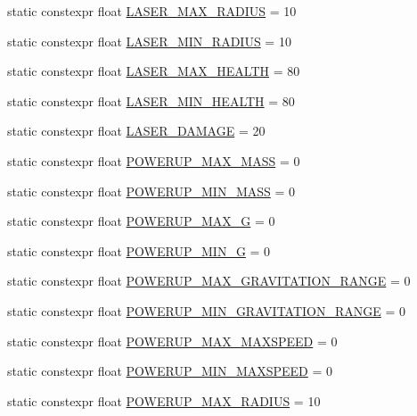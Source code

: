 \begin{DoxyCompactItemize}
\item 
static constexpr float \hyperlink{class_act_conf_a1390b199da20ff11340cf353c75214d9}{L\+A\+S\+E\+R\+\_\+\+M\+A\+X\+\_\+\+R\+A\+D\+I\+U\+S} = 10
\item 
static constexpr float \hyperlink{class_act_conf_a82640220f6656034ee26ad49a2b73b9a}{L\+A\+S\+E\+R\+\_\+\+M\+I\+N\+\_\+\+R\+A\+D\+I\+U\+S} = 10
\item 
static constexpr float \hyperlink{class_act_conf_a536a950abcd330987f54791a57ccccb1}{L\+A\+S\+E\+R\+\_\+\+M\+A\+X\+\_\+\+H\+E\+A\+L\+T\+H} = 80
\item 
static constexpr float \hyperlink{class_act_conf_ae02d18076a07bf6059bf6df5dffe4fd1}{L\+A\+S\+E\+R\+\_\+\+M\+I\+N\+\_\+\+H\+E\+A\+L\+T\+H} = 80
\item 
static constexpr float \hyperlink{class_act_conf_a1f29a01198277a3c0cfeb8226b9c0ab2}{L\+A\+S\+E\+R\+\_\+\+D\+A\+M\+A\+G\+E} = 20
\item 
static constexpr float \hyperlink{class_act_conf_ae478e5bb4115c0a92915029f3a601ec8}{P\+O\+W\+E\+R\+U\+P\+\_\+\+M\+A\+X\+\_\+\+M\+A\+S\+S} = 0
\item 
static constexpr float \hyperlink{class_act_conf_a158916d4ae5c59ead3bc818deccc270c}{P\+O\+W\+E\+R\+U\+P\+\_\+\+M\+I\+N\+\_\+\+M\+A\+S\+S} = 0
\item 
static constexpr float \hyperlink{class_act_conf_a8fbd08c18f70df5af43e85ef4920cdba}{P\+O\+W\+E\+R\+U\+P\+\_\+\+M\+A\+X\+\_\+\+G} = 0
\item 
static constexpr float \hyperlink{class_act_conf_a3977a3808f719611b96014842d20435e}{P\+O\+W\+E\+R\+U\+P\+\_\+\+M\+I\+N\+\_\+\+G} = 0
\item 
static constexpr float \hyperlink{class_act_conf_ada24ed05884db1e2cdc365aa0d095cf3}{P\+O\+W\+E\+R\+U\+P\+\_\+\+M\+A\+X\+\_\+\+G\+R\+A\+V\+I\+T\+A\+T\+I\+O\+N\+\_\+\+R\+A\+N\+G\+E} = 0
\item 
static constexpr float \hyperlink{class_act_conf_afd6eeae83a436cd4d2f481c6fe58e8f4}{P\+O\+W\+E\+R\+U\+P\+\_\+\+M\+I\+N\+\_\+\+G\+R\+A\+V\+I\+T\+A\+T\+I\+O\+N\+\_\+\+R\+A\+N\+G\+E} = 0
\item 
static constexpr float \hyperlink{class_act_conf_a9390d897e9e49f32f4580e8720972d97}{P\+O\+W\+E\+R\+U\+P\+\_\+\+M\+A\+X\+\_\+\+M\+A\+X\+S\+P\+E\+E\+D} = 0
\item 
static constexpr float \hyperlink{class_act_conf_acb19e08ce7a643cb3759fd1fb973b7dc}{P\+O\+W\+E\+R\+U\+P\+\_\+\+M\+I\+N\+\_\+\+M\+A\+X\+S\+P\+E\+E\+D} = 0
\item 
static constexpr float \hyperlink{class_act_conf_a90dc6d4b99d41b4793639c2dc6bf28b1}{P\+O\+W\+E\+R\+U\+P\+\_\+\+M\+A\+X\+\_\+\+R\+A\+D\+I\+U\+S} = 10

\end{DoxyCompactItemize}
